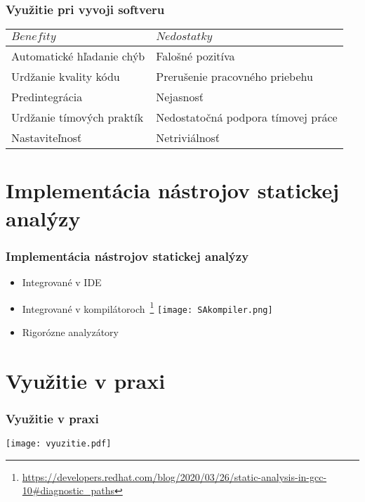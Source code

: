 \documentclass{beamer}
\newcommand{\footcite}[1]{\footnote{\tiny #1}}
\begin{document}
\begin{frame}[fragile=singleslide]\frametitle{Využitie pri vyvoji softveru}

	\begin{table}
		\begin{center}
			\begin{tabular}{l|l}
				$Benefity$                & $Nedostatky$                       \\
				\hline
				Automatické hľadanie chýb & Falošné pozitíva                   \\
				Urdžanie kvality kódu     & Prerušenie pracovného priebehu     \\
				Predintegrácia            & Nejasnosť                          \\
				Urdžanie tímových praktík & Nedostatočná podpora tímovej práce \\
				Nastaviteľnosť            & Netriviálnosť                      \\
			\end{tabular}
		\end{center}
	\end{table}

\end{frame}

\section{Implementácia nástrojov statickej analýzy}

\begin{frame}[fragile=singleslide]\frametitle{Implementácia nástrojov statickej analýzy}
	\begin{itemize}
		\item Integrované v IDE
		\item Integrované v kompilátoroch~\footcite{\url{https://developers.redhat.com/blog/2020/03/26/static-analysis-in-gcc-10\#diagnostic_paths}}
		      \texttt{[image: SAkompiler.png]}
		\item Rigorózne analyzátory
	\end{itemize}
\end{frame}

\section{Využitie v praxi}

\begin{frame}[fragile=singleslide]\frametitle{Využitie v praxi}
	\centerline{\texttt{[image: vyuzitie.pdf]}}
\end{frame}
\end{document}
